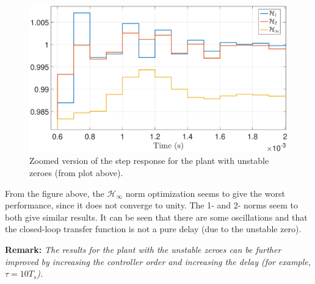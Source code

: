 \documentclass[12pt]{article}
\begin{document}
\begin{figure}[H]
\centering
\includegraphics[width=\columnwidth]{pics/step_close_up}
\caption{Zoomed version of the step response for the plant with unstable zeroes (from plot above).}
\label{fig:unstable_zero_resp}
\end{figure} 

From the figure above, the $\mathcal{H}_\infty$ norm optimization seems to give the worst performance, since it does not converge to unity. The 1- and 2- norms seem to both give similar results. It can be seen that there are some oscillations and that the closed-loop transfer function is not a pure delay (due to the unstable zero).

{\bf Remark:} \textit{The results for the plant with the unstable zeroes can be further improved by increasing the controller order and increasing the delay (for example, $\tau = 10T_s$).}
\end{document}
